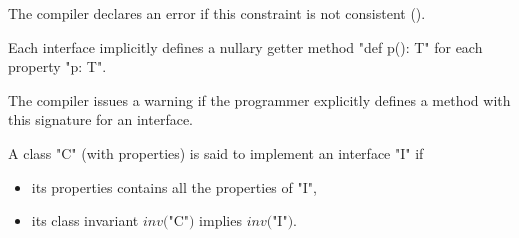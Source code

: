 \begin{staticrule*}
   The compiler declares an error if this constraint
   is not consistent ().  
\end{staticrule*}

Each interface implicitly defines a nullary getter method
\xcd"def p(): T" for each property \xcd"p: T". 

\begin{staticrule*}
   The compiler issues a warning if the programmer
   explicitly defines a method with this signature for an interface.
\end{staticrule*}

A class \xcd"C" (with properties) is said to implement an interface \xcd"I" if
\begin{itemize}
  \item its properties contains all the properties of \xcd"I",
\item its class invariant
$\mathit{inv}($\xcd"C"$)$ implies
$\mathit{inv}($\xcd"I"$)$.
\end{itemize}

